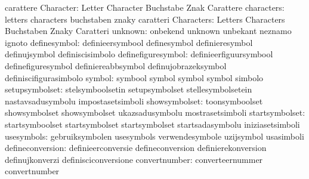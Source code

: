                                   carattere
                       Character: Letter                           Character
                                  Buchstabe                        Znak
                                  Carattere
                      characters: letters                          characters
                                  buchstaben                       znaky
                                  caratteri
                      Characters: Letters                          Characters
                                  Buchstaben                       Znaky
                                  Caratteri
                         unknown: onbekend                         unknown
                                  unbekant                         neznamo
                                  ignoto
                    definesymbol: definieersymbool                 definesymbol
                                  definieresymbol                  definujsymbol
                                  definiscisimbolo
              definefiguresymbol: definieerfiguursymbool           definefiguresymbol
                                  definiereabbsymbol               definujobrazeksymbol
                                  definiscifigurasimbolo
                          symbol: symbool                          symbol
                                  symbol                           symbol
                                  simbolo
                  setupsymbolset: stelsymboolsetin                 setupsymbolset
                                  stellesymbolsetein               nastavsadusymbolu
                                  impostasetsimboli
                   showsymbolset: toonsymboolset                   showsymbolset
                                  showsymbolset                    ukazsadusymbolu
                                  mostrasetsimboli                 %
                  startsymbolset: startsymboolset                  startsymbolset
                                  startsymbolset                   startsadasymbolu
                                  iniziasetsimboli                 %
                      usesymbols: gebruiksymbolen                  usesymbols
                                  verwendesymbole                  uzijsymbol
                                  usasimboli
                defineconversion: definieerconversie               defineconversion
                                  definierekonversion              definujkonverzi
                                  definisciconversione
                   convertnumber: converteernummer                 convertnumber
